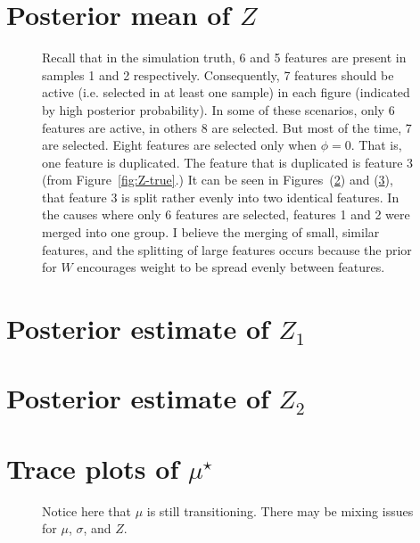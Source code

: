 \documentclass[10pt]{article} %
\begin{document}
\section{Posterior mean of $Z$}
\begin{figure}[H]
  \begin{center}  %
  \end{center}
  \caption{Recall that in the simulation truth, 6 and 5 features are present in
    samples 1 and 2 respectively. Consequently, 7 features should be active
    (i.e. selected in at least one sample) in each figure (indicated by high
    posterior probability). In some of these scenarios, only 6 features are
    active, in others 8 are selected. But most of the time, 7 are selected. 
    Eight features are selected only when $\phi=0$. That is, one feature is duplicated.
    The feature that is duplicated is feature 3 (from Figure~\ref{fig:Z-true}.)
    It can be seen in Figures~(\ref{fig:z1}) and (\ref{fig:z2}), that feature 3 is
    split rather evenly into two identical features. In the causes where only 6 features
    are selected, features 1 and 2 were merged into one group. I believe the merging 
    of small, similar features, and the splitting of large features occurs because the 
    prior for $W$ encourages weight to be spread evenly between features.}
  \label{fig:zmean}
\end{figure}

\newpage
\section{Posterior estimate of $Z_1$}
\begin{figure}[H]
  \begin{center}  %
  \end{center}
  \label{fig:z1}
\end{figure}

\newpage
\section{Posterior estimate of $Z_2$}
\begin{figure}[H]
  \begin{center}  %
  \end{center}
  \label{fig:z2}
\end{figure}

\newpage
\section{Trace plots of $\mu^\star$}
\begin{figure}[H]
  \begin{center}  %
  \end{center}
  \label{fig:mutrace}
  \caption{Notice here that $\mu$ is still transitioning. There may be mixing
  issues for $\mu$, $\sigma$, and $Z$. }
\end{figure}
\end{document}
